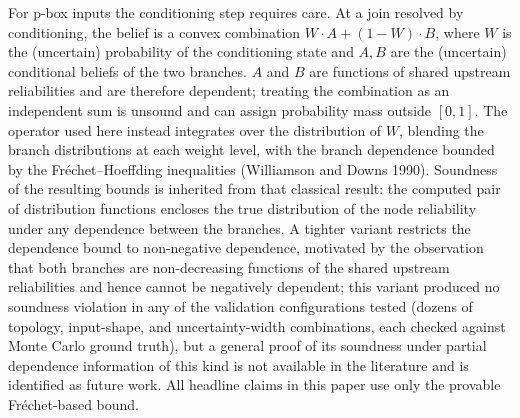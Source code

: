 \documentclass[preprint,12pt]{elsarticle}
\theoremstyle{definition}
\begin{document}
For p-box inputs the conditioning step requires care. At a join resolved by conditioning, the belief is
a convex combination $W\cdot A+(1-W)\cdot B$, where $W$ is the (uncertain) probability of the
conditioning state and $A,B$ are the (uncertain) conditional beliefs of the two branches. $A$ and $B$
are functions of shared upstream reliabilities and are therefore dependent; treating the combination as
an independent sum is unsound and can assign probability mass outside $[0,1]$. The operator used here
instead integrates over the distribution of $W$, blending the branch distributions at each weight level,
with the branch dependence bounded by the Fr\'echet--Hoeffding inequalities (Williamson and Downs 1990).
Soundness of the resulting bounds is inherited from that classical result: the computed pair of
distribution functions encloses the true distribution of the node reliability under any dependence
between the branches. A tighter variant restricts the dependence bound to non-negative dependence,
motivated by the observation that both branches are non-decreasing functions of the shared upstream
reliabilities and hence cannot be negatively dependent; this variant produced no soundness violation in
any of the validation configurations tested (dozens of topology, input-shape, and uncertainty-width
combinations, each checked against Monte Carlo ground truth), but a general proof of its soundness under
partial dependence information of this kind is not available in the literature and is identified as
future work. All headline claims in this paper use only the provable Fr\'echet-based bound.
\end{document}
